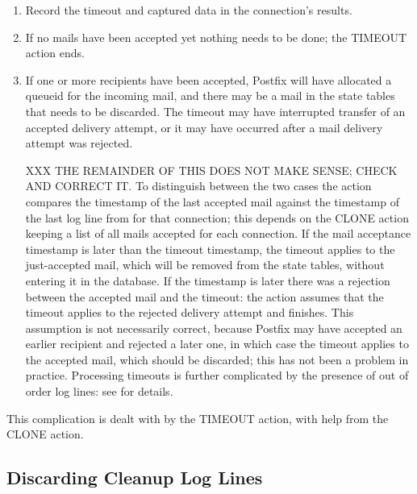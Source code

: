\begin{enumerate}

    \item Record the timeout and captured data in the connection's results.

    \item If no mails have been accepted yet nothing needs to be done; the
        TIMEOUT action ends.

    \item If one or more recipients have been accepted, Postfix will have
        allocated a queueid for the incoming mail, and there may be a mail
        in the state tables that needs to be discarded.  The timeout may
        have interrupted transfer of an accepted delivery attempt, or it
        may have occurred after a mail delivery attempt was rejected.

        XXX THE REMAINDER OF THIS DOES NOT MAKE SENSE\@; CHECK AND CORRECT
        IT\@.  To distinguish between the two cases the action compares the
        timestamp of the last accepted mail against the timestamp of the
        last log line from  for that connection; this depends
        on the CLONE action keeping a list of all mails accepted for each
        connection.  If the mail acceptance timestamp is later than the
        timeout timestamp, the timeout applies to the just-accepted mail,
        which will be removed from the state tables, without entering it in
        the database.  If the  timestamp is later there was a
        rejection between the accepted mail and the timeout: the action
        assumes that the timeout applies to the rejected delivery attempt
        and finishes.  This assumption is not necessarily correct, because
        Postfix may have accepted an earlier recipient and rejected a later
        one, in which case the timeout applies to the accepted mail, which
        should be discarded; this has not been a problem in practice.
        Processing timeouts is further complicated by the presence of out
        of order  log lines: see  for details.

\end{enumerate}

This complication is dealt with by the TIMEOUT action, with help from the
CLONE action.

\subsection{Discarding Cleanup Log Lines}

